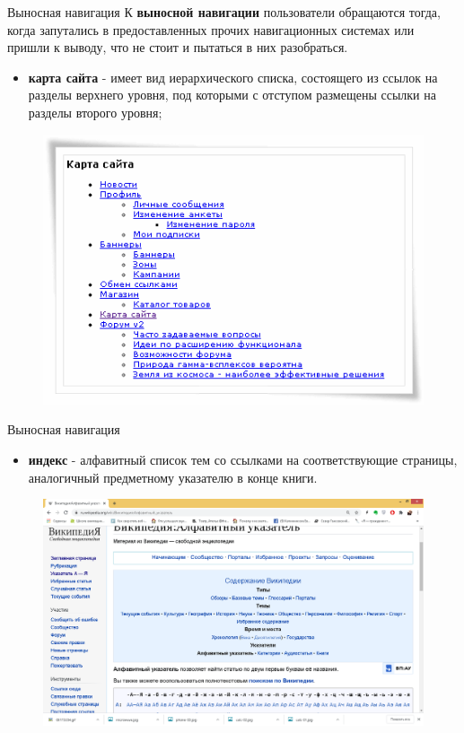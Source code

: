 \documentclass{beamer}
\begin{document}
\begin{frame}[t]{Выносная навигация}
К \textbf{выносной навигации} пользователи обращаются тогда, когда запутались в предоставленных прочих навигационных системах или пришли к выводу, что не стоит и пытаться в них разобраться.
\begin{itemize}
\item \textbf{карта сайта} - имеет вид иерархического списка, состоящего из ссылок на разделы верхнего уровня, под которыми с отступом размещены ссылки на разделы второго уровня; 
\end{itemize} 
\begin{figure}[h]
\centering
\includegraphics[scale=0.5]{images/lec04-pic17.png}
\end{figure}
\end{frame}

\begin{frame}[t]{Выносная навигация}
\begin{itemize}
\item \textbf{индекс} - алфавитный список тем со ссылками на соответствующие страницы, аналогичный предметному указателю в конце книги.
\end{itemize} 
\begin{figure}[h]
\centering
\includegraphics[scale=0.25]{images/lec04-pic18.png}
\end{figure}
\end{frame}
\end{document}
